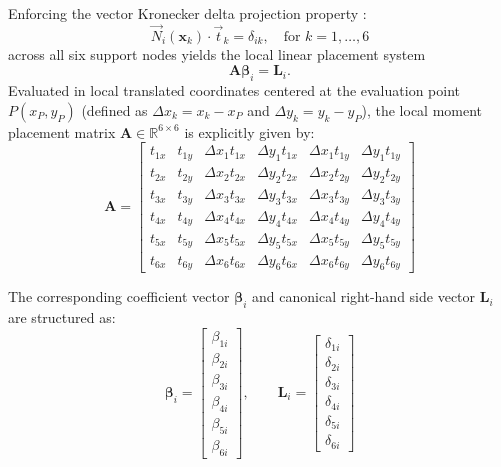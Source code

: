 \documentclass[preprint,12pt]{elsarticle}
\begin{document}
Enforcing the vector Kronecker delta projection property \cite{ortiz2021nodal}:
\begin{equation}
\vec{N}_i(\mathbf{x}_k) \cdot \vec{t}_k = \delta_{ik}, \quad \text{for } k = 1, \dots, 6
\label{eq:kronecker_projection_P1}
\end{equation}
across all six support nodes yields the local linear placement system 
\begin{equation}
\mathbf{A} \boldsymbol{\beta}_i = \mathbf{L}_i. 
\label{eq:linear_system_P1}
\end{equation}
Evaluated in local translated coordinates centered at the evaluation point $P(x_P, y_P)$ (defined as $\Delta x_k = x_k - x_P$ and $\Delta y_k = y_k - y_P$), the local moment placement matrix $\mathbf{A} \in \mathbb{R}^{6 \times 6}$ is explicitly given by:
\begin{equation}
\mathbf{A} = \begin{bmatrix}
t_{1x} & t_{1y} & \Delta x_1 t_{1x} & \Delta y_1 t_{1x} & \Delta x_1 t_{1y} & \Delta y_1 t_{1y} \\[4pt]
t_{2x} & t_{2y} & \Delta x_2 t_{2x} & \Delta y_2 t_{2x} & \Delta x_2 t_{2y} & \Delta y_2 t_{2y} \\[4pt]
t_{3x} & t_{3y} & \Delta x_3 t_{3x} & \Delta y_3 t_{3x} & \Delta x_3 t_{3y} & \Delta y_3 t_{3y} \\[4pt]
t_{4x} & t_{4y} & \Delta x_4 t_{4x} & \Delta y_4 t_{4x} & \Delta x_4 t_{4y} & \Delta y_4 t_{4y} \\[4pt]
t_{5x} & t_{5y} & \Delta x_5 t_{5x} & \Delta y_5 t_{5x} & \Delta x_5 t_{5y} & \Delta y_5 t_{5y} \\[4pt]
t_{6x} & t_{6y} & \Delta x_6 t_{6x} & \Delta y_6 t_{6x} & \Delta x_6 t_{6y} & \Delta y_6 t_{6y}
\end{bmatrix}
\label{eq:matrix_A_6x6}
\end{equation}

The corresponding coefficient vector $\boldsymbol{\beta}_i$ and canonical right-hand side vector $\mathbf{L}_i$ are structured as:
\begin{equation}
\boldsymbol{\beta}_i = \begin{bmatrix} \beta_{1i} \\[2pt] \beta_{2i} \\[2pt] \beta_{3i} \\[2pt] \beta_{4i} \\[2pt] \beta_{5i} \\[2pt] \beta_{6i} \end{bmatrix}, \qquad 
\mathbf{L}_i = \begin{bmatrix} \delta_{1i} \\[2pt] \delta_{2i} \\[2pt] \delta_{3i} \\[2pt] \delta_{4i} \\[2pt] \delta_{5i} \\[2pt] \delta_{6i} \end{bmatrix}
\label{eq:beta_and_L_vectors_P1}
\end{equation}
\end{document}
